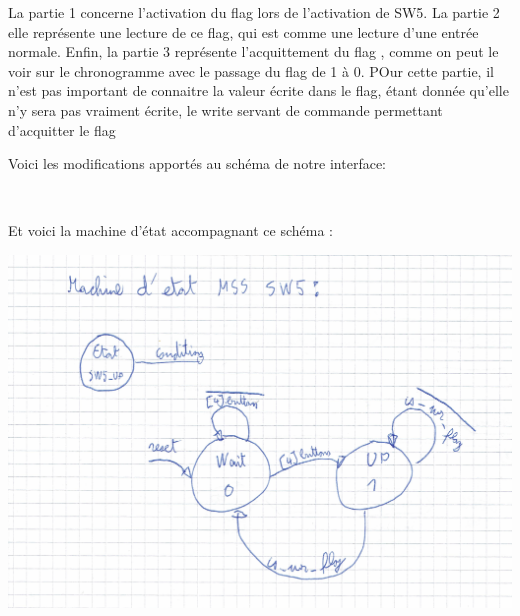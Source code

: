 \par
La partie 1 concerne l'activation du flag lors de l'activation de SW5. La partie 2 elle représente une lecture de ce flag, qui est comme une lecture d'une entrée normale. Enfin, la partie 3 représente l'acquittement du flag , comme on peut le voir sur le chronogramme avec le passage du flag de 1 à 0. POur cette partie, il n'est pas important de connaitre la valeur écrite dans le flag, étant donnée qu'elle n'y sera pas vraiment écrite, le write servant de commande permettant d'acquitter le flag\\\par
Voici les modifications apportés au schéma de notre interface:
\begin{center}
\\\par
{}
\end{center}\par
\par
Et voici la machine d'état accompagnant ce schéma : \\
\begin{center}
\includegraphics[scale=0.1]{./images/partie2_MSS.jpg}\\\par
{}
\end{center}\par
